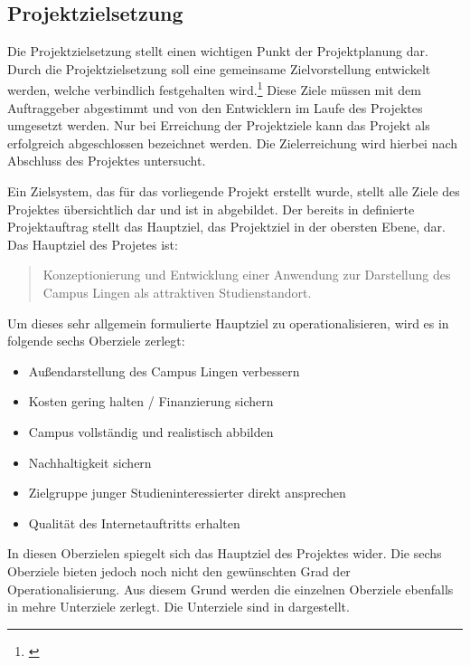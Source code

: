\subsection{Projektzielsetzung}
\label{sec:Projektzielsetzung}

Die Projektzielsetzung stellt einen wichtigen Punkt der Projektplanung dar.
Durch die Projektzielsetzung soll eine gemeinsame Zielvorstellung entwickelt
werden, welche verbindlich festgehalten wird.\footnote{\citet[S.~34]{litke2007}}
Diese Ziele müssen mit dem Auftraggeber abgestimmt und von den Entwicklern im
Laufe des Projektes umgesetzt werden. Nur bei Erreichung der Projektziele kann
das Projekt als erfolgreich abgeschlossen bezeichnet werden. Die Zielerreichung
wird hierbei nach Abschluss des Projektes untersucht.

Ein Zielsystem, das für das vorliegende Projekt erstellt wurde, stellt alle 
Ziele des Projektes übersichtlich dar und ist in  abgebildet. 
Der bereits in definierte Projektauftrag stellt das Hauptziel, 
das Projektziel in der obersten Ebene, dar. Das Hauptziel des Projetes ist:

\begin{quote}
Konzeptionierung und Entwicklung einer Anwendung zur Darstellung des 
Campus Lingen als attraktiven Studienstandort.
\end{quote}

Um dieses sehr allgemein formulierte Hauptziel zu operationalisieren, wird
es in folgende sechs Oberziele zerlegt:

\begin{itemize}
  \item Außendarstellung des Campus Lingen verbessern
  \item Kosten gering halten / Finanzierung sichern
  \item Campus vollständig und realistisch abbilden
  \item Nachhaltigkeit sichern
  \item Zielgruppe junger Studieninteressierter direkt ansprechen
  \item Qualität des Internetauftritts erhalten
\end{itemize}

In diesen Oberzielen spiegelt sich das Hauptziel des Projektes wider. Die
sechs Oberziele bieten jedoch noch nicht den gewünschten Grad der
Operationalisierung. Aus diesem Grund werden die einzelnen Oberziele ebenfalls
in mehre Unterziele zerlegt. Die Unterziele sind in  dargestellt.

